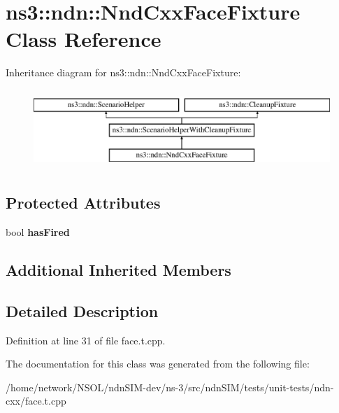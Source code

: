 \hypertarget{classns3_1_1ndn_1_1NndCxxFaceFixture}{}\section{ns3\+:\+:ndn\+:\+:Nnd\+Cxx\+Face\+Fixture Class Reference}
\label{classns3_1_1ndn_1_1NndCxxFaceFixture}
Inheritance diagram for ns3\+:\+:ndn\+:\+:Nnd\+Cxx\+Face\+Fixture\+:\begin{figure}[H]
\begin{center}
\leavevmode
\includegraphics[height=3.000000cm]{classns3_1_1ndn_1_1NndCxxFaceFixture}
\end{center}
\end{figure}
\subsection*{Protected Attributes}
\begin{DoxyCompactItemize}
\item 
bool {\bfseries has\+Fired}\hypertarget{classns3_1_1ndn_1_1NndCxxFaceFixture_a5790d382b08686fb0413398dec901248}{}\label{classns3_1_1ndn_1_1NndCxxFaceFixture_a5790d382b08686fb0413398dec901248}

\end{DoxyCompactItemize}
\subsection*{Additional Inherited Members}


\subsection{Detailed Description}


Definition at line 31 of file face.\+t.\+cpp.



The documentation for this class was generated from the following file\+:\begin{DoxyCompactItemize}
\item 
/home/network/\+N\+S\+O\+L/ndn\+S\+I\+M-\/dev/ns-\/3/src/ndn\+S\+I\+M/tests/unit-\/tests/ndn-\/cxx/face.\+t.\+cpp\end{DoxyCompactItemize}
